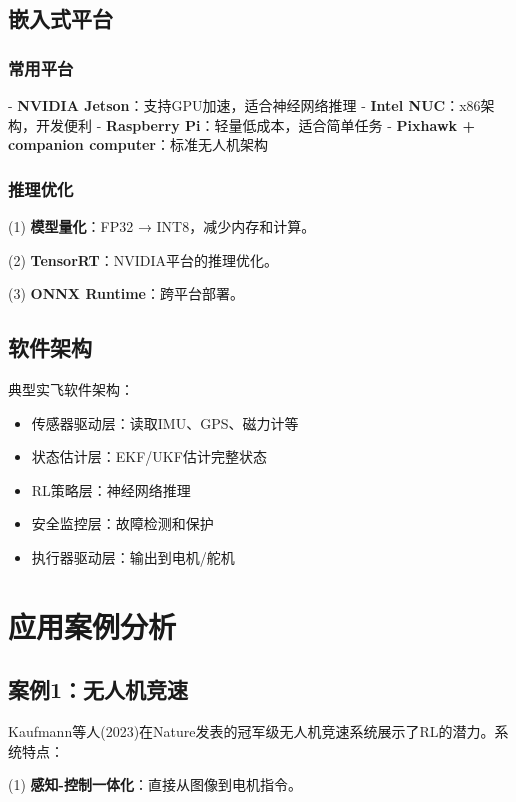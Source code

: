 \subsection{嵌入式平台}

\subsubsection{常用平台}

- \textbf{NVIDIA Jetson}：支持GPU加速，适合神经网络推理
- \textbf{Intel NUC}：x86架构，开发便利
- \textbf{Raspberry Pi}：轻量低成本，适合简单任务
- \textbf{Pixhawk +  companion computer}：标准无人机架构

\subsubsection{推理优化}

(1) \textbf{模型量化}：FP32 → INT8，减少内存和计算。

(2) \textbf{TensorRT}：NVIDIA平台的推理优化。

(3) \textbf{ONNX Runtime}：跨平台部署。

\subsection{软件架构}

典型实飞软件架构：
\begin{itemize}
    \item 传感器驱动层：读取IMU、GPS、磁力计等
    \item 状态估计层：EKF/UKF估计完整状态
    \item RL策略层：神经网络推理
    \item 安全监控层：故障检测和保护
    \item 执行器驱动层：输出到电机/舵机
\end{itemize}

\section{应用案例分析}\label{sec:case_studies}

\subsection{案例1：无人机竞速}

Kaufmann等人(2023)在Nature发表的冠军级无人机竞速系统展示了RL的潜力。系统特点：

(1) \textbf{感知-控制一体化}：直接从图像到电机指令。

